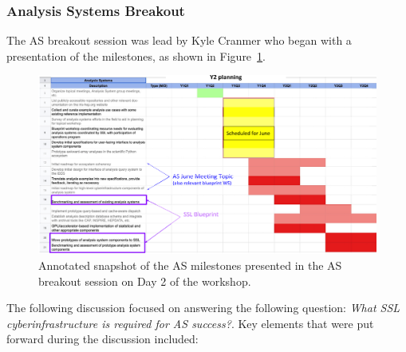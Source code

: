 \documentclass[11pt,letterpaper,fleqn]{article}
\begin{document}
\subsubsection{Analysis Systems Breakout}

The AS breakout session was lead by Kyle Cranmer who began with a presentation of the milestones, as shown in Figure~\ref{fig:AS_milestones}.
\begin{figure}
  \includegraphics[width=\linewidth]{figures/as_milestones.png}
  \caption{Annotated snapshot of the AS milestones presented in the AS breakout session on Day 2 of the workshop.}
  \label{fig:AS_milestones}
\end{figure}
The following discussion focused on answering the following question: {\it What SSL cyberinfrastructure is required for AS success?}. Key elements that were put forward during the discussion included:
\end{document}
